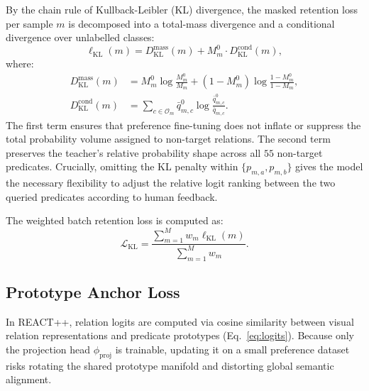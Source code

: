 \documentclass[10pt,twocolumn,letterpaper]{article}
\begin{document}
By the chain rule of Kullback-Leibler (KL) divergence, the masked retention loss per sample $m$ is decomposed into a total-mass divergence and a conditional divergence over unlabelled classes:
\begin{equation}
    \ell_{\mathrm{KL}}(m) = D_{\mathrm{KL}}^{\mathrm{mass}}(m) + M_m^0 \cdot D_{\mathrm{KL}}^{\mathrm{cond}}(m),
\label{eq:sample_kl}
\end{equation}
where:
\begin{align}
    D_{\mathrm{KL}}^{\mathrm{mass}}(m) &= M_m^0 \log \frac{M_m^0}{M_m} + (1-M_m^0) \log \frac{1-M_m^0}{1-M_m}, \\
    D_{\mathrm{KL}}^{\mathrm{cond}}(m) &= \sum_{c\in\mathcal{O}_m} \bar{q}_{m,c}^0 \log \frac{\bar{q}_{m,c}^0}{\bar{q}_{m,c}}.
\end{align}
The first term ensures that preference fine-tuning does not inflate or suppress the total probability volume assigned to non-target relations. The second term preserves the teacher's relative probability shape across all $55$ non-target predicates. Crucially, omitting the KL penalty within $\{p_{m,a}, p_{m,b}\}$ gives the model the necessary flexibility to adjust the relative logit ranking between the two queried predicates according to human feedback.

The weighted batch retention loss is computed as:
\begin{equation}
    \mathcal{L}_{\mathrm{KL}} = \frac{\sum_{m=1}^M w_m \ell_{\mathrm{KL}}(m)}{\sum_{m=1}^M w_m}.
    \label{eq:kl_loss}
\end{equation}

\subsection{Prototype Anchor Loss}

In REACT++, relation logits are computed via cosine similarity between visual relation representations and predicate prototypes (Eq.~\eqref{eq:logits}). Because only the projection head $\phi_{\mathrm{proj}}$ is trainable, updating it on a small preference dataset risks rotating the shared prototype manifold and distorting global semantic alignment.
\end{document}
